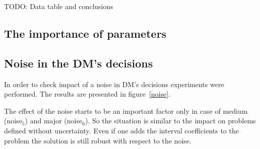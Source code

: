TODO: Data table and conclusions
\clearpage{}

\subsection{The importance of parameters}
\clearpage{}

\subsection{Noise in the DM's decisions}

In order to check impact of a noise in DM's decisions experiments were
performed. The results are presented in figure~\ref{noise}.

The effect of the noise starts to be an important factor only in case of
medium (noise$_5$) and major (noise$_6$). So the situation is similar to the
impact on problems defined without uncertainty. Even if one adds the interval
coefficients to the problem the solution is still robust with respect to the
noise.


